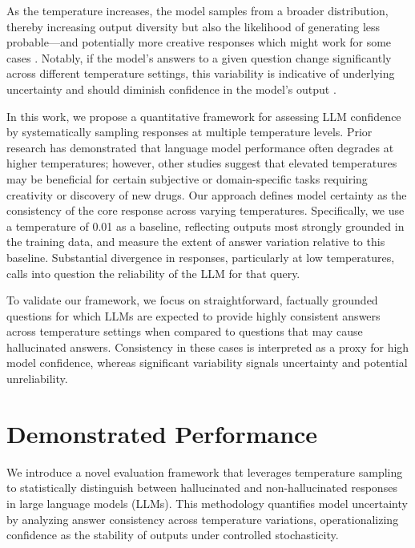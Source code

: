 \documentclass[sigconf]{acmart}
\begin{document}
As the temperature increases, the model samples from a broader distribution, thereby increasing output diversity but also the likelihood of generating less probable—and potentially more creative responses which might work for some cases \cite{hallucinations_drug,temperature_effect}. Notably, if the model's answers to a given question change significantly across different temperature settings, this variability is indicative of underlying uncertainty and should diminish confidence in the model's output \cite{detecting_hallucinations}.

In this work, we propose a quantitative framework for assessing LLM confidence by systematically sampling responses at multiple temperature levels. Prior research has demonstrated that language model performance often degrades at higher temperatures; however, other studies suggest that elevated temperatures may be beneficial for certain subjective or domain-specific tasks \cite{hallucinations_drug,temperature_effect,detecting_hallucinations} requiring creativity or discovery of new drugs. Our approach defines model certainty as the consistency of the core response across varying temperatures. Specifically, we use a temperature of 0.01 as a baseline, reflecting outputs most strongly grounded in the training data, and measure the extent of answer variation relative to this baseline. Substantial divergence in responses, particularly at low temperatures, calls into question the reliability of the LLM for that query.

To validate our framework, we focus on straightforward, factually grounded questions for which LLMs are expected to provide highly consistent answers across temperature settings when compared to questions that may cause hallucinated answers.
Consistency in these cases is interpreted as a proxy for high model confidence, whereas significant variability signals uncertainty and potential unreliability.


\section{Demonstrated Performance}

We introduce a novel evaluation framework that leverages temperature sampling to statistically distinguish between hallucinated and non-hallucinated responses in large language models (LLMs). This methodology quantifies model uncertainty by analyzing answer consistency across temperature variations, operationalizing confidence as the stability of outputs under controlled stochasticity.
\end{document}
